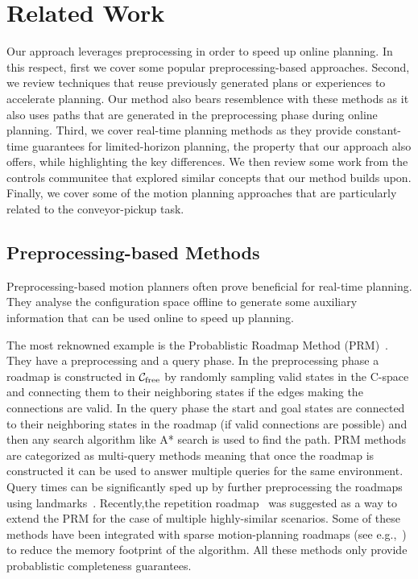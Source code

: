 \documentclass[a4paper]{report}
\begin{document}
\newpage
\chapter{Related Work}
\label{sec:rel}
Our approach leverages preprocessing in order to speed up online planning. In this respect, first we cover some popular preprocessing-based approaches. Second, we review techniques that reuse previously generated plans or experiences to accelerate planning. Our method also bears resemblence with these methods as it also uses paths that are generated in the preprocessing phase during online planning. Third, we cover real-time planning methods as they provide constant-time guarantees for limited-horizon planning, the property that our approach also offers, while highlighting the key differences. We then review some work from the controls communitee that explored similar concepts that our method builds upon. Finally, we cover some of the motion planning approaches that are particularly related to the conveyor-pickup task.

\section{Preprocessing-based Methods}
Preprocessing-based motion planners often prove beneficial for real-time planning. They analyse the configuration space offline to generate some auxiliary information that can be used online to speed up planning. 

The most reknowned example is the Probablistic Roadmap Method (PRM)~\cite{kavraki1996probabilistic}. They have a preprocessing and a query phase. In the preprocessing phase a roadmap is constructed in $\mathcal{C}_{\rm free}$ by randomly sampling valid states in the C-space and connecting them to their neighboring states if the edges making the connections are valid. In the query phase the start and goal states are connected to their neighboring states in the roadmap (if valid connections are possible) and then any search algorithm like A* search is used to find the path. PRM methods are categorized as multi-query methods meaning that once the roadmap is constructed it can be used to answer multiple queries for the same environment. Query times can be significantly sped up by further preprocessing the roadmaps using landmarks~\cite{paden2017landmark}. Recently,the repetition roadmap~\cite{LA18} was suggested as a way to extend the PRM for the case of multiple highly-similar scenarios. Some of these methods have been integrated with sparse motion-planning roadmaps (see e.g.,~\cite{SSAH14,DB14}) to reduce the memory footprint of the algorithm. All these methods only provide probablistic completeness guarantees.
\end{document}
